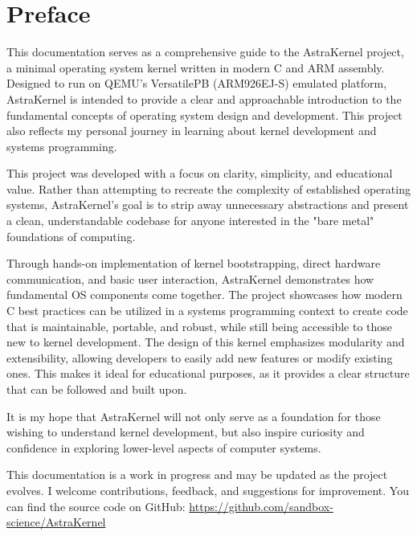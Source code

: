 \onehalfspacing
\newpage
{}
\section*{Preface}

This documentation serves as a comprehensive guide to the AstraKernel project, 
a minimal operating system kernel written in modern C and ARM assembly. 
Designed to run on QEMU’s VersatilePB (ARM926EJ-S) emulated platform, 
AstraKernel is intended to provide a clear and approachable introduction 
to the fundamental concepts of operating system design and development.
This project also reflects my personal journey in learning about kernel development  
and systems programming.

This project was developed with a focus on clarity, simplicity, and educational value. 
Rather than attempting to recreate the complexity of established operating systems, 
AstraKernel’s goal is to strip away unnecessary abstractions and present a clean, 
understandable codebase for anyone interested in the "bare metal" foundations of computing.

Through hands-on implementation of kernel bootstrapping, direct hardware communication, 
and basic user interaction, AstraKernel demonstrates how fundamental OS components 
come together. The project showcases how modern C best practices can be utilized 
in a systems programming context to create code that is maintainable, portable, and robust, 
while still being accessible to those new to kernel development. The design of this kernel 
emphasizes modularity and extensibility, allowing developers to easily add new features 
or modify existing ones. This makes it ideal for educational purposes, as it provides 
a clear structure that can be followed and built upon.

It is my hope that AstraKernel will not only serve as a foundation for those wishing 
to understand kernel development, but also inspire curiosity and confidence in exploring 
lower-level aspects of computer systems.

\begin{info}
  This documentation is a work in progress and may be updated
  as the project evolves. I welcome contributions, feedback,
  and suggestions for improvement. You can find the source code on GitHub:
  \url{https://github.com/sandbox-science/AstraKernel}
\end{info}

